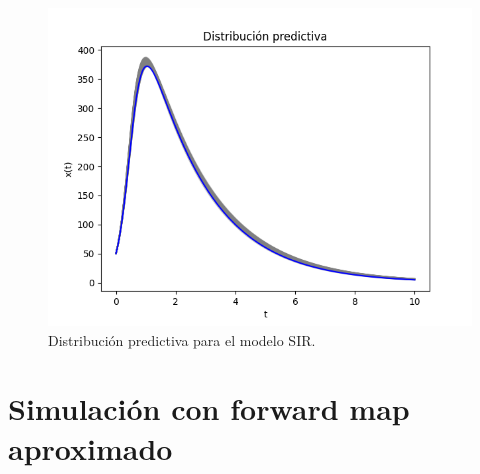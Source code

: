 \begin{figure}[H] 
    \centering 
    \includegraphics[width = 10 cm ]{img/Exp_Central_SIR_sigma/Figuras/Generales/Predictiva_SIR_sigma.png} 
    \caption{Distribución predictiva para el modelo SIR.}
    \label{Fig. SIR_06}
\end{figure} 


\section{Simulación con forward map aproximado}






